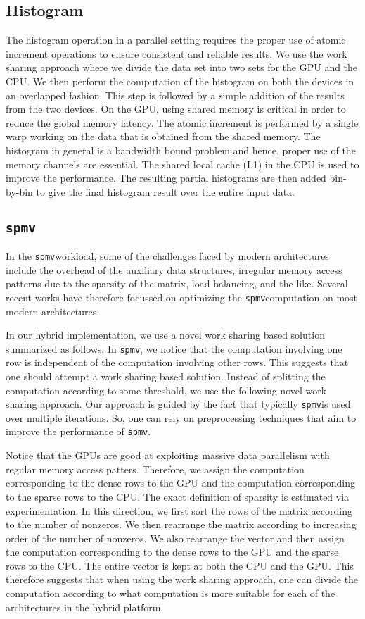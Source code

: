 \documentclass[11pt]{article}
\newcommand{\spmv} {{\tt spmv}}
\begin{document}
\subsection{Histogram}
The histogram operation in a parallel setting requires the
proper use of atomic increment operations to ensure consistent
and reliable results. We use the work sharing approach
where we divide the data set into two sets for the GPU and
the CPU. We then perform the computation of the histogram on both
the devices in an overlapped fashion. This step is followed by a simple
addition of the results from the two devices. On the GPU, using shared memory
is critical in order to reduce the global memory latency. The atomic
increment is performed by a single warp working on the data that is
obtained from the shared memory. The histogram in general is a bandwidth
bound problem and hence, proper use of the memory channels are essential.
The shared local cache (L1) in the CPU is used to improve the performance.
The resulting partial  histograms are then
added bin-by-bin to give the final histogram result over the
entire input data.



\subsection{\spmv}
In the \spmv  workload, some of the challenges faced by modern architectures
include the overhead of the auxiliary data structures, irregular memory
access patterns due to the sparsity of the matrix, load balancing, and the
like. Several recent works \cite{BG09} have therefore focussed on optimizing
the \spmv computation on most modern architectures. 

In our hybrid implementation, we use a novel work sharing based solution 
summarized as follows. 
In \spmv , we notice that the computation involving one row is independent of
the computation involving other rows. This suggests that one should attempt a
work sharing based solution. Instead of splitting the computation according to
some threshold, we use  the following novel work sharing approach. Our
approach is guided by the fact that typically \spmv  is used over multiple
iterations. So, one can rely on preprocessing techniques that aim to improve
the performance of \spmv. 

Notice that the GPUs are good at exploiting massive data parallelism
with regular memory access patters. Therefore, we assign the
computation corresponding to the dense rows to the GPU and the computation
corresponding to the sparse rows to the CPU. The exact definition of
sparsity is estimated via experimentation. In this direction, we first sort
the rows of the matrix according to the number of nonzeros. We then rearrange
the matrix according to increasing order of the number of nonzeros. We also
rearrange the  vector and then assign the computation corresponding to the
dense rows to the GPU and the sparse rows to the CPU. The entire  vector is
kept at both the CPU and the GPU. This therefore suggests that
when using the work sharing approach, one can divide the computation according to what
computation is more suitable for each of the architectures in the hybrid
platform.
\end{document}
